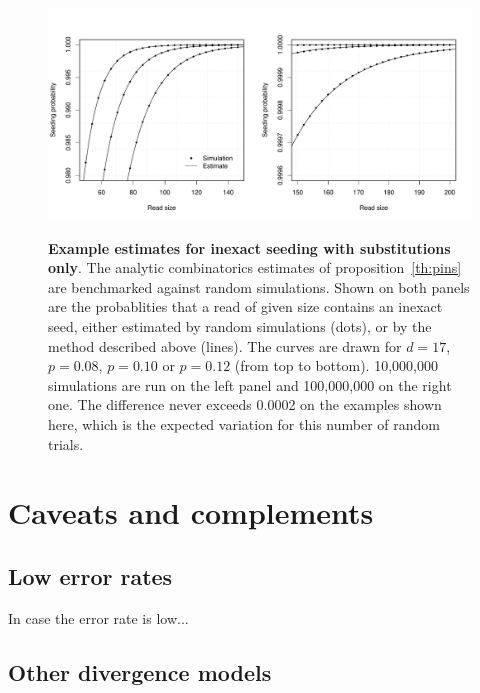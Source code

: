 \documentclass{article}
\begin{document}
\begin{figure}[h]
\centering
\includegraphics[scale=0.445]{simulp-inexact.pdf}
\label{fig:simulpinexact}
\caption{\textbf{Example estimates for inexact seeding with substitutions
only}. The analytic combinatorics estimates of proposition~\ref{th:pins}
are benchmarked against random simulations.  Shown on both panels are the
probablities that a read of given size contains an inexact seed, either
estimated by random simulations (dots), or by the method described above
(lines). The curves are drawn for $d=17$, $p=0.08$, $p=0.10$ or $p=0.12$
(from top to bottom). 10,000,000 simulations are run on the left panel and
100,000,000 on the right one.  The difference never exceeds 0.0002 on the
examples shown here, which is the expected variation for this number of
random trials.}
\end{figure}












\section{Caveats and complements}

\subsection{Low error rates}

In case the error rate is low...

\subsection{Other divergence models}
\end{document}

